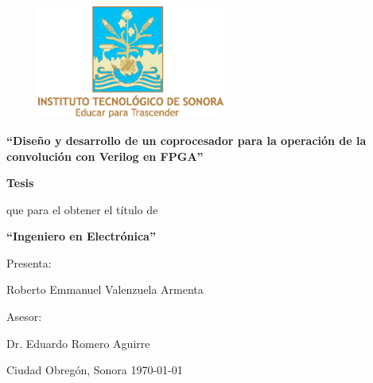 \thispagestyle{empty}
\begin{figure}[!t]
\centering
\includegraphics[width=0.55\textwidth, height=0.25\textheight]{./figs/logoclr}
\end{figure}

\begin{center}

{\bf \LARGE ``Diseño y desarrollo de un coprocesador para la operación de la convolución con Verilog en FPGA''}

\vspace*{0.75cm}

{\bf \Large Tesis }

\vspace*{0.65cm}

{\Large que para el obtener el título de}

\vspace{0.65cm}

{\bf \Large ``Ingeniero en Electrónica''}

\vspace{0.75cm}

\begin{framed}

{\large Presenta:}

\vspace{0.3cm}

{\large Roberto Emmanuel Valenzuela Armenta}

\vspace{0.3cm}

{\large Asesor:}

\vspace{0.3cm}

{\large Dr. Eduardo Romero Aguirre}

\end{framed}

\vfill

\begin{shaded*}
{\large {\color{white}Ciudad Obregón, Sonora \hfill \today}}
\end{shaded*}

\end{center}

\pagebreak